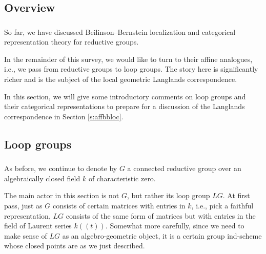 \documentclass[10pt]{amsart}
\theoremstyle{remark}
\numberwithin{equation}{section}
\begin{document}
	
	\subsection{Overview}
	
	\subsubsection{}  So far, we have discussed Beilinson--Bernstein 
	localization and categorical representation theory for reductive groups. 
	
	In the remainder of this survey, we would like to turn to their affine 
	analogues, i.e., 
	we pass from reductive groups to loop groups. The story here is 
	significantly richer and is the subject of the local geometric Langlands 
	correspondence. 
	
	
	In this section, we will give some introductory comments on loop groups and 
	their categorical representations to prepare for a discussion of the 
	Langlands correspondence in Section \ref{s:affbbloc}. 
	
	
	\subsection{Loop groups}
	
	
	\subsubsection{} As before, we continue to denote by $G$ a connected 
	reductive group over an algebraically closed field $k$ of characteristic 
	zero. 
	
	The main actor in this section is not $G$, but rather its loop group $LG$. At first 
	pass, just 
	as $G$ consists of certain matrices with entries in $k$, i.e., pick a 
	faithful representation,  $LG$ consists of the same form of matrices but 
	with entries in the field of Laurent series $k(\!(t)\!)$. Somewhat more 
	carefully, since we need to make sense of $LG$ as an algebro-geometric 
	object, it is a certain group ind-scheme whose closed points are as we just 
	described. 
	
\end{document}
